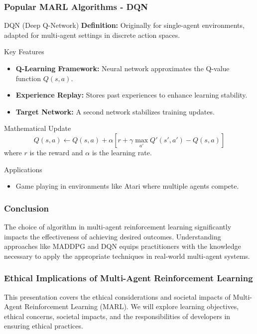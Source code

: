 \documentclass[aspectratio=169]{beamer}
\begin{document}
\begin{frame}[fragile]
    \frametitle{Popular MARL Algorithms - DQN}
    \begin{block}{DQN (Deep Q-Network)}
        \textbf{Definition:} Originally for single-agent environments, adapted for multi-agent settings in discrete action spaces.
    \end{block}
    \begin{block}{Key Features}
        \begin{itemize}
            \item \textbf{Q-Learning Framework:} Neural network approximates the Q-value function \( Q(s, a) \).
            \item \textbf{Experience Replay:} Stores past experiences to enhance learning stability.
            \item \textbf{Target Network:} A second network stabilizes training updates.
        \end{itemize}
    \end{block}
    \begin{block}{Mathematical Update}
        \begin{equation}
            Q(s, a) \leftarrow Q(s, a) + \alpha \left[ r + \gamma \max_{a'} Q'(s', a') - Q(s, a) \right]
        \end{equation}
        where \( r \) is the reward and \( \alpha \) is the learning rate.
    \end{block}
    \begin{block}{Applications}
        \begin{itemize}
            \item Game playing in environments like Atari where multiple agents compete.
        \end{itemize}
    \end{block}
\end{frame}

\begin{frame}[fragile]
    \frametitle{Conclusion}
    The choice of algorithm in multi-agent reinforcement learning significantly impacts the effectiveness of achieving desired outcomes. Understanding approaches like MADDPG and DQN equips practitioners with the knowledge necessary to apply the appropriate techniques in real-world multi-agent systems.
\end{frame}

\begin{frame}[fragile]
    \frametitle{Ethical Implications of Multi-Agent Reinforcement Learning}
    This presentation covers the ethical considerations and societal impacts of Multi-Agent Reinforcement Learning (MARL). 
    We will explore learning objectives, ethical concerns, societal impacts, and the responsibilities of developers in ensuring ethical practices.
\end{frame}
\end{document}
